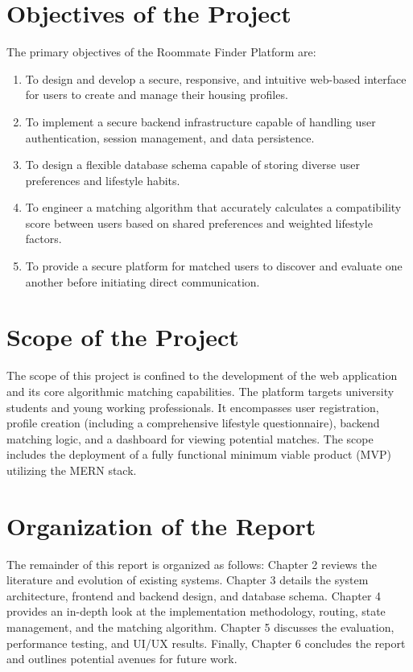 \documentclass[12pt,a4paper]{report}
\begin{document}
\section{Objectives of the Project}
The primary objectives of the Roommate Finder Platform are:
\begin{enumerate}
    \item To design and develop a secure, responsive, and intuitive web-based interface for users to create and manage their housing profiles.
    \item To implement a secure backend infrastructure capable of handling user authentication, session management, and data persistence.
    \item To design a flexible database schema capable of storing diverse user preferences and lifestyle habits.
    \item To engineer a matching algorithm that accurately calculates a compatibility score between users based on shared preferences and weighted lifestyle factors.
    \item To provide a secure platform for matched users to discover and evaluate one another before initiating direct communication.
\end{enumerate}

\section{Scope of the Project}
The scope of this project is confined to the development of the web application and its core algorithmic matching capabilities. The platform targets university students and young working professionals. It encompasses user registration, profile creation (including a comprehensive lifestyle questionnaire), backend matching logic, and a dashboard for viewing potential matches. The scope includes the deployment of a fully functional minimum viable product (MVP) utilizing the MERN stack.

\section{Organization of the Report}
The remainder of this report is organized as follows: Chapter 2 reviews the literature and evolution of existing systems. Chapter 3 details the system architecture, frontend and backend design, and database schema. Chapter 4 provides an in-depth look at the implementation methodology, routing, state management, and the matching algorithm. Chapter 5 discusses the evaluation, performance testing, and UI/UX results. Finally, Chapter 6 concludes the report and outlines potential avenues for future work.
\end{document}
